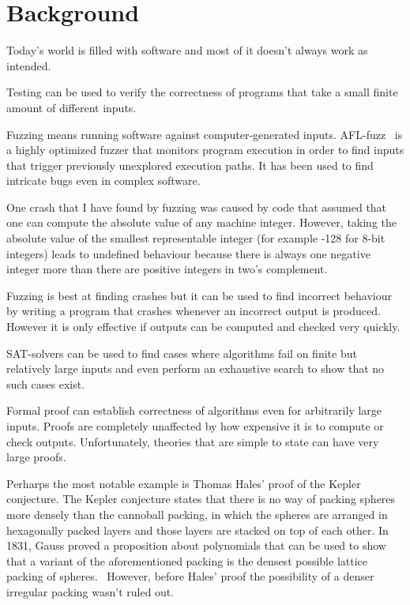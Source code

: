\documentclass[english, 12pt, a4paper, sci, a-1b, online]{aaltothesis}
\begin{document}
\thispagestyle{empty}

\clearpage
\section{Background}

Today's world is filled with software and most of it doesn't always work as intended.

Testing can be used to verify the correctness of programs that take a small finite amount of different inputs.

Fuzzing means running software against computer-generated inputs. AFL-fuzz~\cite{AFL} is a highly optimized fuzzer that monitors program execution in order to find inputs that trigger previously unexplored execution paths. It has been used to find intricate bugs even in complex software.

One crash that I have found by fuzzing was caused by code that assumed that one can compute the absolute value of any machine integer. However, taking the absolute value of the smallest representable integer (for example -128 for 8-bit integers) leads to undefined behaviour because there is always one negative integer more than there are positive integers in two's complement.

Fuzzing is best at finding crashes but it can be used to find incorrect behaviour by writing a program that crashes whenever an incorrect output is produced. However it is only effective if outputs can be computed and checked very quickly.

SAT-solvers can be used to find cases where algorithms fail on finite but relatively large inputs and even perform an exhaustive search to show that no such cases exist.

Formal proof can establish correctness of algorithms even for arbitrarily large inputs. Proofs are completely unaffected by how expensive it is to compute or check outputs. Unfortunately, theories that are simple to state can have very large proofs.

Perharps the most notable example is Thomas Hales' proof of the Kepler conjecture. The Kepler conjecture states that there is no way of packing spheres more densely than the cannoball packing, in which the spheres are arranged in hexagonally packed layers and those layers are stacked on top of each other. In 1831, Gauss proved a proposition about polynomials that can be used to show that a variant of the aforementioned packing is the densest possible lattice packing of spheres.~\cite{dichteste} However, before Hales' proof the possibility of a denser irregular packing wasn't ruled out.
\end{document}
